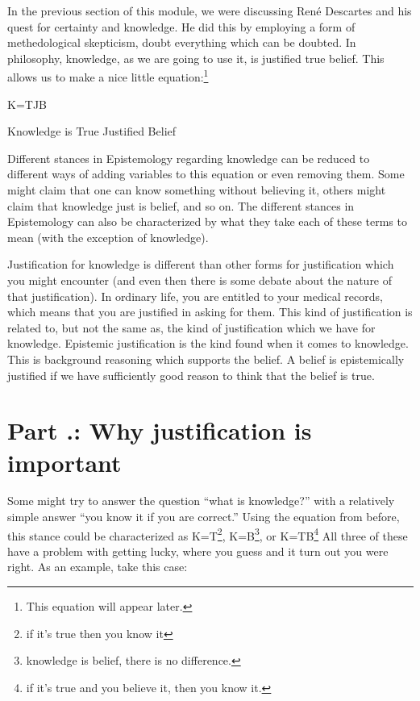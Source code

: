 In the previous section of this module, we were discussing Ren\'e Descartes and his quest for certainty and knowledge. He did this by employing a form of methedological skepticism, doubt everything which can be doubted. In philosophy, \gls{knowledge}, as we are going to use it, is justified true belief. This allows us to make a nice little equation:\footnote{This equation will appear later.}

\begin{center}

K=TJB

Knowledge is True Justified Belief
\end{center}

Different stances in Epistemology regarding knowledge can be reduced to different ways of adding variables to this equation or even removing them. Some might claim that one can know something without believing it, others might claim that knowledge just is belief, and so on. The different stances in Epistemology can also be characterized by what they take each of these terms to mean (with the exception of knowledge). 

Justification for knowledge is different than other forms for justification which you might encounter (and even then there is some debate about the nature of that justification). In ordinary life, you are entitled to your medical records, which means that you are justified in asking for them. This kind of justification is related to, but not the same as, the kind of justification which we have for knowledge. Epistemic justification is the kind found when it comes to knowledge. This is background reasoning which supports the belief. A belief is epistemically justified if we have sufficiently good reason to think that the belief is true. 
\section{Part \thechapcount.\theseccount: Why justification is important}

Some might try to answer the question ``what is knowledge?'' with a relatively simple answer ``you know it if you are correct.'' Using the equation from before, this stance could be characterized as K=T\footnote{if it's true then you know it}, K=B\footnote{knowledge is belief, there is no difference.}, or  K=TB\footnote{if it's true and you believe it, then you know it.} All three of these have a problem with getting lucky, where you guess and it turn out you were right. As an example, take this case:

